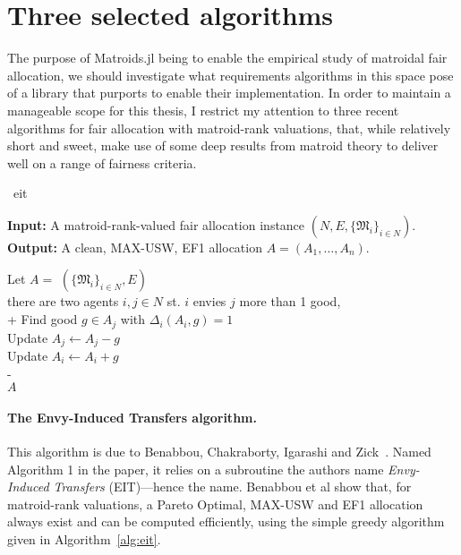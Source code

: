 \section{Three selected algorithms}
\label{sec:three-algos}
The purpose of Matroids.jl being to enable the empirical study of matroidal fair allocation, we should investigate what requirements algorithms in this space pose of a library that purports to enable their implementation. In order to maintain a manageable scope for this thesis, I restrict my attention to three recent algorithms for fair allocation with matroid-rank valuations, that, while relatively short and sweet, make use of some deep results from matroid theory to deliver well on a range of fairness criteria.

\begin{algorithm}{~\cite{benabbou-2021}}{eit}

\textbf{Input:}  \tab A matroid-rank-valued fair allocation instance $(N, E, \{\mathfrak{M}_i\}_{i\in N})$.\\
\textbf{Output:} \tab A clean, MAX-USW, EF1 allocation $A = (A_1,\dots,A_n)$.

\begin{pseudo}[label=\small\arabic*, indent-mark]
    Let $A =$ $(\{\mathfrak{M}_i\}_{i\in N}, E)$  \\
     there are two agents $i,j\in N$ st. $i$ envies $j$ more than 1 good,   \\+
        Find good $g \in A_j$ with $\Delta_i(A_i, g) = 1$ \\
        Update $A_j \leftarrow A_j - g$ \\
        Update $A_i \leftarrow A_i + g$ \\-
     \\
     $A$
\end{pseudo}
  
\end{algorithm}

\paragraph{The Envy-Induced Transfers algorithm.} This algorithm is due to Benabbou, Chakraborty, Igarashi and Zick~\cite{benabbou-2021}. Named Algorithm 1 in the paper, it relies on a subroutine the authors name \textit{Envy-Induced Transfers} (EIT)---hence the name. Benabbou et al show that, for matroid-rank valuations, a Pareto Optimal, MAX-USW and EF1 allocation always exist and can be computed efficiently, using the simple greedy algorithm given in Algorithm~\ref{alg:eit}.

